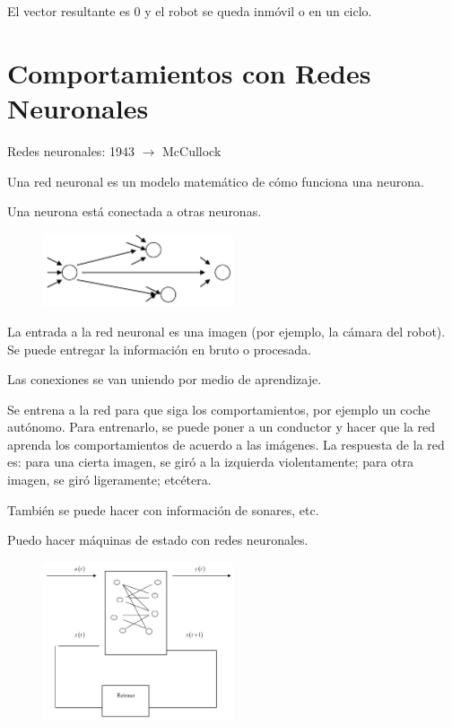 El vector resultante es 0 y el robot se queda inmóvil o en un ciclo.

\section{Comportamientos con Redes Neuronales}

Redes neuronales: 1943 $\rightarrow$  McCullock


Una red neuronal es un modelo matemático de cómo funciona una neurona.

Una neurona está conectada a otras neuronas.

\begin{figure}[h!]
	\centering
	\includegraphics[width=0.5\textwidth]{images/img72.png}
	\label{figura72}
\end{figure}

La entrada a la red neuronal es una imagen (por ejemplo, la cámara del robot). Se puede entregar la
información en bruto o procesada.

Las conexiones se van uniendo por medio de aprendizaje.

Se entrena a la red para que siga los comportamientos, por ejemplo un coche autónomo. Para entrenarlo, se
puede poner a un conductor y hacer que la red aprenda los comportamientos de acuerdo a las imágenes.
La respuesta de la red es: para una cierta imagen, se giró a la izquierda violentamente; para otra imagen, se
giró ligeramente; etcétera.

También se puede hacer con información de sonares, etc.

Puedo hacer máquinas de estado con redes neuronales.

\begin{figure}[h!]
	\centering
	\includegraphics[width=0.5\textwidth]{images/img73.png}
	\label{figura73}
\end{figure}

